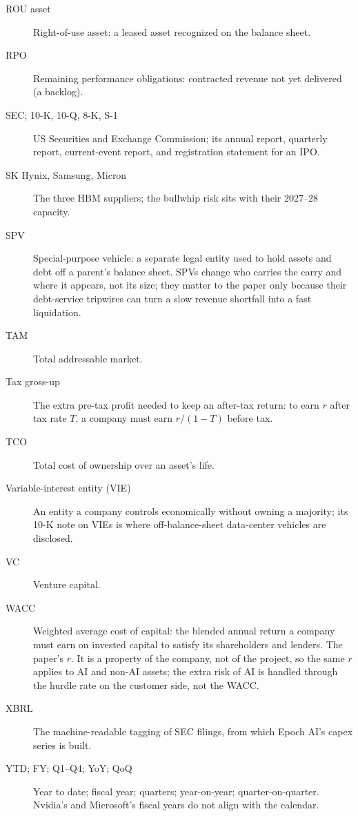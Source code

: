 \documentclass[11pt,letterpaper]{article}
\begin{document}
\begin{description}
\item[ROU asset] Right-of-use asset: a leased asset recognized on the balance sheet.
\item[RPO] Remaining performance obligations: contracted revenue not yet delivered (a backlog).
\item[SEC; 10-K, 10-Q, 8-K, S-1] US Securities and Exchange Commission; its annual report, quarterly report, current-event report, and registration statement for an IPO.
\item[SK Hynix, Samsung, Micron] The three HBM suppliers; the bullwhip risk sits with their 2027--28 capacity.
\item[SPV] Special-purpose vehicle: a separate legal entity used to hold assets and debt off a parent's balance sheet. SPVs change who carries the carry and where it appears, not its size; they matter to the paper only because their debt-service tripwires can turn a slow revenue shortfall into a fast liquidation.
\item[TAM] Total addressable market.
\item[Tax gross-up] The extra pre-tax profit needed to keep an after-tax return: to earn $r$ after tax rate $T$, a company must earn $r/(1-T)$ before tax.
\item[TCO] Total cost of ownership over an asset's life.
\item[Variable-interest entity (VIE)] An entity a company controls economically without owning a majority; its 10-K note on VIEs is where off-balance-sheet data-center vehicles are disclosed.
\item[VC] Venture capital.
\item[WACC] Weighted average cost of capital: the blended annual return a company must earn on invested capital to satisfy its shareholders and lenders. The paper's $r$. It is a property of the company, not of the project, so the same $r$ applies to AI and non-AI assets; the extra risk of AI is handled through the hurdle rate on the customer side, not the WACC.
\item[XBRL] The machine-readable tagging of SEC filings, from which Epoch AI's capex series is built.
\item[YTD; FY; Q1--Q4; YoY; QoQ] Year to date; fiscal year; quarters; year-on-year; quarter-on-quarter. Nvidia's and Microsoft's fiscal years do not align with the calendar.
\end{description}
\end{document}
